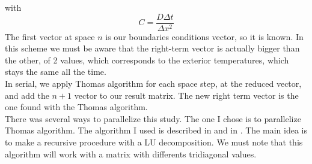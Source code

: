 \documentclass{article}
\begin{document}
                    with $$C = \frac{D\Delta t}{\Delta x ^2}  $$ 
                    The first vector at space $n$ is our boundaries conditions vector, so it is known.
                    In this scheme we must be aware that the right-term vector is actually bigger than
                    the other, of 2 values, which corresponds to the exterior temperatures, which stays
                    the same all the time.\\
                    In serial, we apply Thomas algorithm for each space step, at the reduced vector, and add the $n+1$ vector to our 
                    result matrix. The new right term vector is the one found with the Thomas algorithm.\\
                    There was several ways to parallelize this study. The one I chose is to
                    parallelize Thomas algorithm. The algorithm I used is described in \cite{thomasalg1}
                    and in \cite{thomasalg2}. The main idea is to make a recursive procedure with a LU decomposition.
                    We must note that this algorithm will work with a matrix with differents tridiagonal values.
\end{document}
